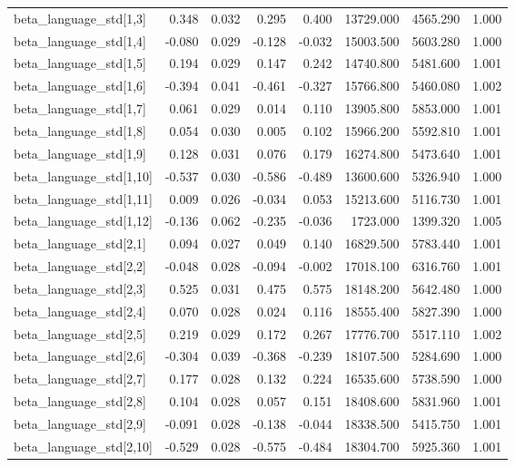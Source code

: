 \begin{tabular}{lrrrrrrr}
beta\_language\_std[1,3] & 0.348 & 0.032 & 0.295 & 0.400 & 13729.000 & 4565.290 & 1.000 \\
beta\_language\_std[1,4] & -0.080 & 0.029 & -0.128 & -0.032 & 15003.500 & 5603.280 & 1.000 \\
beta\_language\_std[1,5] & 0.194 & 0.029 & 0.147 & 0.242 & 14740.800 & 5481.600 & 1.001 \\
beta\_language\_std[1,6] & -0.394 & 0.041 & -0.461 & -0.327 & 15766.800 & 5460.080 & 1.002 \\
beta\_language\_std[1,7] & 0.061 & 0.029 & 0.014 & 0.110 & 13905.800 & 5853.000 & 1.001 \\
beta\_language\_std[1,8] & 0.054 & 0.030 & 0.005 & 0.102 & 15966.200 & 5592.810 & 1.001 \\
beta\_language\_std[1,9] & 0.128 & 0.031 & 0.076 & 0.179 & 16274.800 & 5473.640 & 1.001 \\
beta\_language\_std[1,10] & -0.537 & 0.030 & -0.586 & -0.489 & 13600.600 & 5326.940 & 1.000 \\
beta\_language\_std[1,11] & 0.009 & 0.026 & -0.034 & 0.053 & 15213.600 & 5116.730 & 1.001 \\
beta\_language\_std[1,12] & -0.136 & 0.062 & -0.235 & -0.036 & 1723.000 & 1399.320 & 1.005 \\
beta\_language\_std[2,1] & 0.094 & 0.027 & 0.049 & 0.140 & 16829.500 & 5783.440 & 1.001 \\
beta\_language\_std[2,2] & -0.048 & 0.028 & -0.094 & -0.002 & 17018.100 & 6316.760 & 1.001 \\
beta\_language\_std[2,3] & 0.525 & 0.031 & 0.475 & 0.575 & 18148.200 & 5642.480 & 1.000 \\
beta\_language\_std[2,4] & 0.070 & 0.028 & 0.024 & 0.116 & 18555.400 & 5827.390 & 1.000 \\
beta\_language\_std[2,5] & 0.219 & 0.029 & 0.172 & 0.267 & 17776.700 & 5517.110 & 1.002 \\
beta\_language\_std[2,6] & -0.304 & 0.039 & -0.368 & -0.239 & 18107.500 & 5284.690 & 1.000 \\
beta\_language\_std[2,7] & 0.177 & 0.028 & 0.132 & 0.224 & 16535.600 & 5738.590 & 1.000 \\
beta\_language\_std[2,8] & 0.104 & 0.028 & 0.057 & 0.151 & 18408.600 & 5831.960 & 1.001 \\
beta\_language\_std[2,9] & -0.091 & 0.028 & -0.138 & -0.044 & 18338.500 & 5415.750 & 1.001 \\
beta\_language\_std[2,10] & -0.529 & 0.028 & -0.575 & -0.484 & 18304.700 & 5925.360 & 1.001 \\

\end{tabular}

